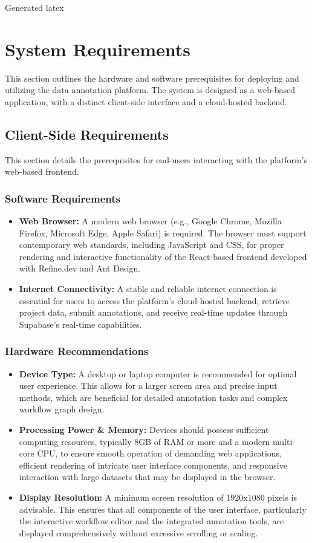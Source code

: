 Generated latex
\section{System Requirements}

This section outlines the hardware and software prerequisites for deploying and utilizing the data annotation platform. The system is designed as a web-based application, with a distinct client-side interface and a cloud-hosted backend.

\subsection{Client-Side Requirements}
This section details the prerequisites for end-users interacting with the platform's web-based frontend.

\subsubsection{Software Requirements}
\begin{itemize}
    \item \textbf{Web Browser:} A modern web browser (e.g., Google Chrome, Mozilla Firefox, Microsoft Edge, Apple Safari) is required. The browser must support contemporary web standards, including JavaScript and CSS, for proper rendering and interactive functionality of the React-based frontend developed with Refine.dev and Ant Design.
    \item \textbf{Internet Connectivity:} A stable and reliable internet connection is essential for users to access the platform's cloud-hosted backend, retrieve project data, submit annotations, and receive real-time updates through Supabase's real-time capabilities.
\end{itemize}

\subsubsection{Hardware Recommendations}
\begin{itemize}
    \item \textbf{Device Type:} A desktop or laptop computer is recommended for optimal user experience. This allows for a larger screen area and precise input methods, which are beneficial for detailed annotation tasks and complex workflow graph design.
    \item \textbf{Processing Power \& Memory:} Devices should possess sufficient computing resources, typically 8GB of RAM or more and a modern multi-core CPU, to ensure smooth operation of demanding web applications, efficient rendering of intricate user interface components, and responsive interaction with large datasets that may be displayed in the browser.
    \item \textbf{Display Resolution:} A minimum screen resolution of 1920x1080 pixels is advisable. This ensures that all components of the user interface, particularly the interactive workflow editor and the integrated annotation tools, are displayed comprehensively without excessive scrolling or scaling.
\end{itemize}

